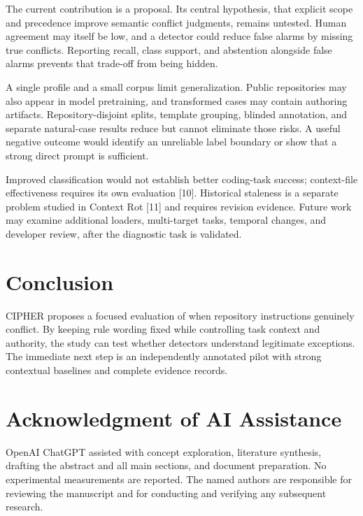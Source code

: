 \documentclass[10pt,conference]{IEEEtran}
\begin{document}
The current contribution is a proposal. Its central hypothesis, that explicit scope and precedence improve semantic conflict judgments, remains untested. Human agreement may itself be low, and a detector could reduce false alarms by missing true conflicts. Reporting recall, class support, and abstention alongside false alarms prevents that trade-off from being hidden.


A single profile and a small corpus limit generalization. Public repositories may also appear in model pretraining, and transformed cases may contain authoring artifacts. Repository-disjoint splits, template grouping, blinded annotation, and separate natural-case results reduce but cannot eliminate those risks. A useful negative outcome would identify an unreliable label boundary or show that a strong direct prompt is sufficient.


Improved classification would not establish better coding-task success; context-file effectiveness requires its own evaluation [10]. Historical staleness is a separate problem studied in Context Rot [11] and requires revision evidence. Future work may examine additional loaders, multi-target tasks, temporal changes, and developer review, after the diagnostic task is validated.


\section{Conclusion}

CIPHER proposes a focused evaluation of when repository instructions genuinely conflict. By keeping rule wording fixed while controlling task context and authority, the study can test whether detectors understand legitimate exceptions. The immediate next step is an independently annotated pilot with strong contextual baselines and complete evidence records.


\section*{Acknowledgment of AI Assistance}
OpenAI ChatGPT assisted with concept exploration, literature synthesis, drafting the abstract and all main sections, and document preparation. No experimental measurements are reported. The named authors are responsible for reviewing the manuscript and for conducting and verifying any subsequent research.
\end{document}
